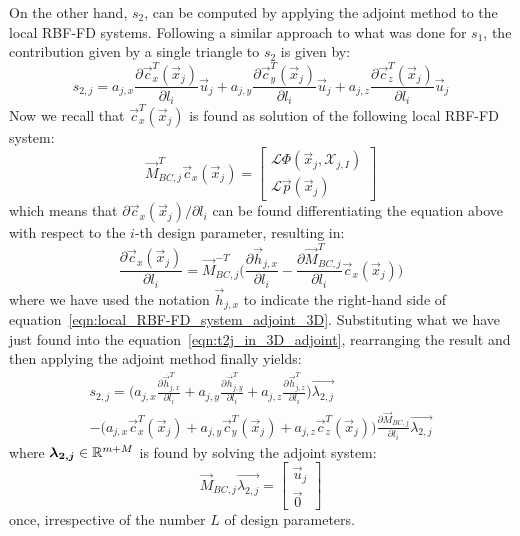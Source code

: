 On the other hand, $s_2$, can be computed by applying the adjoint method to the local RBF-FD systems. Following a similar approach to what was done for $s_1$, the contribution given by a single triangle to $s_2$ is given by:
\begin{equation}
	\label{eqn:t2j_in_3D_adjoint}
	s_{2,j} = a_{j,x}\frac{\partial \vec{c}_x^T(\vec{x}_j)}{\partial l_i}\vec{u}_j + a_{j,y}\frac{\partial \vec{c}_y^T(\vec{x}_j)}{\partial l_i}\vec{u}_j + a_{j,z}\frac{\partial \vec{c}_z^T(\vec{x}_j)}{\partial l_i}\vec{u}_j
\end{equation}
Now we recall that $\vec{c}_x^T(\vec{x}_j)$ is found as solution of the following local RBF-FD system:
\begin{equation}
	\label{eqn:local_RBF-FD_system_adjoint_3D}
	\vec{M}_{BC,j}^T \vec{c}_x(\vec{x}_j) =
	\begin{bmatrix}
		\mathcal{L} \Phi(\vec{x}_j, \mathcal{X}_{j,I})  \\
		\mathcal{L} \vec{p}(\vec{x}_j)
	\end{bmatrix}
\end{equation}
which means that $\partial \vec{c}_x(\vec{x}_j) / \partial l_i$ can be found differentiating the equation above with respect to the $i$-th design parameter, resulting in:
\begin{equation}
	\label{eqn:local_RBF-FD_system_differentited}
	\frac{\partial \vec{c}_x(\vec{x}_j)}{\partial l_i} = \vec{M}_{BC,j}^{-T} \biggl( \frac{\partial \vec{h}_{j,x}}{\partial l_i} - \frac{\partial \vec{M}_{BC,j}^T}{\partial l_i}\vec{c}_x(\vec{x}_j) \biggr)
\end{equation}
where we have used the notation $\vec{h}_{j,x}$ to indicate the right-hand side of equation~\eqref{eqn:local_RBF-FD_system_adjoint_3D}.
Substituting what we have just found into the equation~\eqref{eqn:t2j_in_3D_adjoint}, rearranging the result and then applying the adjoint method finally yields:
\begin{multline}
	s_{2,j} = \biggl( a_{j,x} \frac{\partial \vec{h}_{j,x}^T}{\partial l_i} + a_{j,y} \frac{\partial \vec{h}_{j,y}^T}{\partial l_i} + a_{j,z} \frac{\partial \vec{h}_{j,z}^T}{\partial l_i} \biggr) \vec{\lambda_{2,j}}  \\
	- \biggl( a_{j,x}\vec{c}_x^T(\vec{x}_j) + a_{j,y}\vec{c}_y^T(\vec{x}_j) + a_{j,z}\vec{c}_z^T(\vec{x}_j) \biggr) \frac{\partial \vec{M}_{BC,j}}{\partial l_i} \vec{\lambda_{2,j}}
\end{multline}
where $\boldsymbol{\lambda_{2,j}} \in \mathbb{R}^{m+M}$ is found by solving the adjoint system:
\begin{equation}
	\label{eqn:adjoint_system_t2j}
	\vec{M}_{BC,j} \vec{\lambda_{2,j}} =
	\begin{bmatrix}
		\vec{u}_j  \\
		\vec{0}
	\end{bmatrix}
\end{equation}
once, irrespective of the number $L$ of design parameters.

